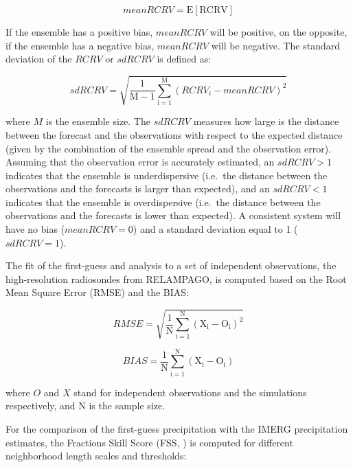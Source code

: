 \documentclass[final,5p,times,twocolumn,authoryear]{elsarticle} %
\begin{document}
\begin{equation}
  \mathrm{\mathit{mean RCRV} = E[RCRV]}
  \label{eq:eq3}
\end{equation}

If the ensemble has a positive bias, \(mean RCRV\) will be positive, on the opposite, if the ensemble has a negative bias, \(mean RCRV\) will be negative. The standard deviation of the \(RCRV\) or \(sd RCRV\) is defined as:

\begin{equation}
  \mathrm{\mathit{sd RCRV} = \sqrt{\frac{1}{M -1}\sum_{i=1}^{M}(\mathit{RCRV_i} - \mathit{mean RCRV})^2}}
  \label{eq:eq4}
\end{equation}

where \(M\) is the ensemble size. The \(sd RCRV\) measures how large is the distance between the forecast and the observations with respect to the expected distance (given by the combination of the ensemble spread and the observation error). Assuming that the observation error is accurately estimated, an \(sd RCRV > 1\) indicates that the ensemble is underdispersive (i.e.~the distance between the observations and the forecasts is larger than expected), and an \(sd RCRV < 1\) indicates that the ensemble is overdispersive (i.e.~the distance between the observations and the forecasts is lower than expected). A consistent system will have no bias (\(mean RCRV = 0\)) and a standard deviation equal to 1 (\(sd RCRV = 1\)).

The fit of the first-guess and analysis to a set of independent observations, the high-resolution radiosondes from RELAMPAGO, is computed based on the Root Mean Square Error (RMSE) and the BIAS:

\begin{equation}
  \mathrm{\mathit{RMSE} = \sqrt{\frac{1}{N}\sum_{i = 1}^{N} (X_i - O_i)^{2}}}
  \label{eq:eq5}
\end{equation}

\begin{equation}
  \mathrm{\mathit{BIAS} = \frac{1}{N}\sum_{i = 1}^{N} (X_i - O_i)}
  \label{eq:eq6}
\end{equation}

where \(O\) and \(X\) stand for independent observations and the simulations respectively, and N is the sample size.

For the comparison of the first-guess precipitation with the IMERG precipitation estimates, the Fractions Skill Score (FSS, \citet{roberts2008}) is computed for different neighborhood length scales and thresholds:
\end{document}
